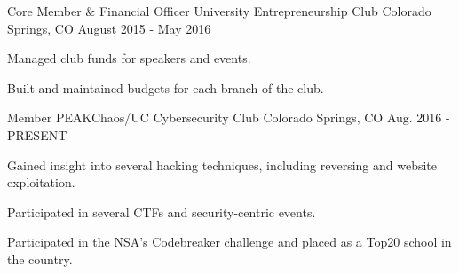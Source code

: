 

\begin{cventries}

  \cventry
    {Core Member \& Financial Officer} %
    {University Entrepreneurship Club} %
    {Colorado Springs, CO} %
    {August 2015 - May 2016} %
    {
      \begin{cvitems} %
        \item {Managed club funds for speakers and events. }
        \item {Built and maintained budgets for each branch of the club. }
      \end{cvitems}
    }

  \cventry
    {Member} %
    {PEAKChaos/UC Cybersecurity Club} %
    {Colorado Springs, CO} %
    {Aug. 2016 - PRESENT} %
    {
      \begin{cvitems} %
        \item {Gained insight into several hacking techniques, including reversing and website exploitation. }
        \item {Participated in several CTFs and security-centric events. }
        \item {Participated in the NSA's Codebreaker challenge and placed as a Top20 school in the country. }
      \end{cvitems}
    }

\end{cventries}

